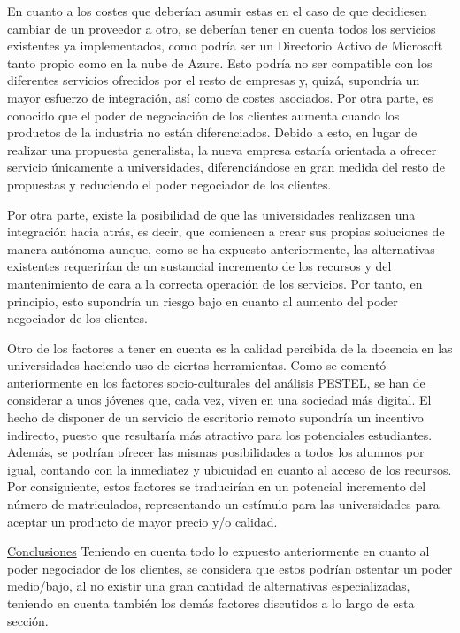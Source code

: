 En cuanto a los costes que deberían asumir estas en el caso de que decidiesen cambiar de un proveedor a otro, se deberían tener en cuenta todos los servicios existentes ya implementados, como podría ser un Directorio Activo de Microsoft tanto propio como en la nube de Azure. Esto podría no ser compatible con los diferentes servicios ofrecidos por el resto de empresas y, quizá, supondría un mayor esfuerzo de integración, así como de costes asociados. Por otra parte, es conocido que el poder de negociación de los clientes aumenta cuando los productos de la industria no están diferenciados. Debido a esto, en lugar de realizar una propuesta generalista, la nueva empresa estaría orientada a ofrecer servicio únicamente a universidades, diferenciándose en gran medida del resto de propuestas y reduciendo el poder negociador de los clientes.

Por otra parte, existe la posibilidad de que las universidades realizasen una integración hacia atrás, es decir, que comiencen a crear sus propias soluciones de manera autónoma aunque, como se ha expuesto anteriormente, las alternativas existentes requerirían de un sustancial incremento de los recursos y del mantenimiento de cara a la correcta operación de los servicios. Por tanto, en principio, esto supondría un riesgo bajo en cuanto al aumento del poder negociador de los clientes.

\clearpage

Otro de los factores a tener en cuenta es la calidad percibida de la docencia en las universidades haciendo uso de ciertas herramientas. Como se comentó anteriormente en los factores socio-culturales del análisis PESTEL, se han de considerar a unos jóvenes que, cada vez, viven en una sociedad más digital. El hecho de disponer de un servicio de escritorio remoto supondría un incentivo indirecto, puesto que resultaría más atractivo para los potenciales estudiantes. Además, se podrían ofrecer las mismas posibilidades a todos los alumnos por igual, contando con la inmediatez y ubicuidad en cuanto al acceso de los recursos. Por consiguiente, estos factores se traducirían en un potencial incremento del número de matriculados, representando un estímulo para las universidades para aceptar un producto de mayor precio y/o calidad.

\noindent\underline{Conclusiones}\newline
\indent Teniendo en cuenta todo lo expuesto anteriormente en cuanto al poder negociador de los clientes, se considera que estos podrían ostentar un poder medio/bajo, al no existir una gran cantidad de alternativas especializadas, teniendo en cuenta también los demás factores discutidos a lo largo de esta sección.

